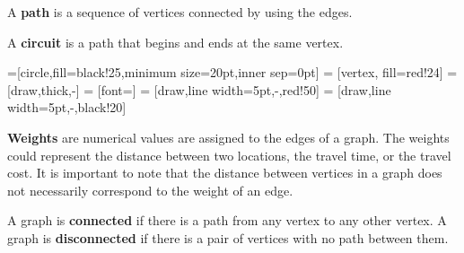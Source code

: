 \documentclass{beamer}
\theoremstyle{definition}
\begin{document}
\begin{frame}
\begin{definition}[Path]
A \textbf{path} is a sequence of vertices connected by using the edges.
\end{definition}

\begin{definition}[Circuit]
A \textbf{circuit} is a path that begins and ends at the same vertex.
\end{definition}

=[circle,fill=black!25,minimum size=20pt,inner sep=0pt]
 = [vertex, fill=red!24]
 = [draw,thick,-]
 = [font=\small]
 = [draw,line width=5pt,-,red!50]
 = [draw,line width=5pt,-,black!20]


\begin{figure}
\end{figure}


\end{frame}


\begin{frame}

\begin{definition}[Weights]
\textbf{Weights} are numerical values are assigned to the edges of a graph.  The weights could represent the distance between two locations, the travel time, or the travel cost.  It is important to note that the distance between vertices in a graph does not necessarily correspond to the weight of an edge.
\end{definition}

\begin{definition}[Connected]
A graph is \textbf{connected} if there is a path from any vertex to any other vertex.  A graph is \textbf{disconnected} if there is a pair of vertices with no path between them.
\end{definition}



\end{frame}
\end{document}
